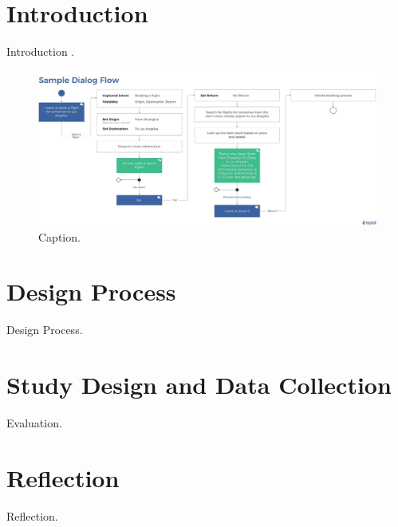 \documentclass[manuscript,review]{acmart}
\begin{document}
\maketitle








\section{Introduction}
Introduction \cite{Cohen04}.

\begin{figure}[h]
  \centering
  \includegraphics[width=\linewidth]{images/sample}
  \caption{Caption.}
\end{figure}



\section{Design Process}
Design Process.


\section{Study Design and Data Collection}
Evaluation.


\section{Reflection}
Reflection.
\end{document}
